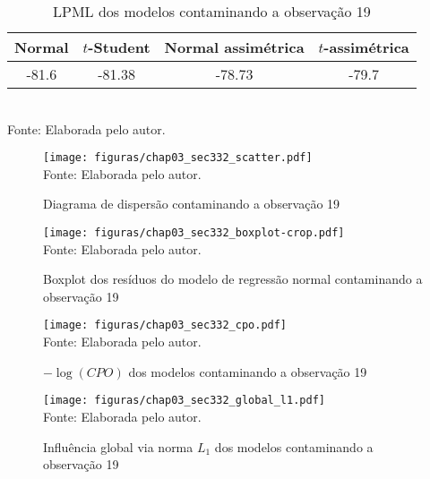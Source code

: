 \begin{table}[H]
\begin{center}
\caption{LPML dos modelos contaminando a observação 19}
\label{tab:chap03_sec332_lpml}
\begin{tabular}{cccc}
 Normal & $t$-Student & Normal assimétrica  & $t$-assimétrica \\ \hline
-81.6 & -81.38 & -78.73 & -79.7 \\ \hline
\end{tabular}
\\ Fonte: Elaborada pelo autor.
\end{center}
\end{table}

\begin{figure}[H]
\begin{center}
\caption{Diagrama de dispersão contaminando a observação 19}
\label{fig:chap03_sec332_scatter}
\texttt{[image: figuras/chap03\_sec332\_scatter.pdf]}
\\ Fonte: Elaborada pelo autor.
\end{center}
\end{figure}

\begin{figure}[H]
\begin{center}
\caption{Boxplot dos resíduos do modelo de regressão normal contaminando a observação 19}
\label{fig:chap03_sec332_boxplot}
\texttt{[image: figuras/chap03\_sec332\_boxplot-crop.pdf]}
\\ Fonte: Elaborada pelo autor.
\end{center}
\end{figure}

\begin{figure}[H]
\begin{center}
\caption{$-\log(CPO)$ dos modelos contaminando a observação 19}
\label{fig:chap03_sec332_cpo}
\texttt{[image: figuras/chap03\_sec332\_cpo.pdf]}
\\ Fonte: Elaborada pelo autor.
\end{center}
\end{figure}

\begin{figure}[H]
\begin{center}
\caption{Influência global via norma $L_1$ dos modelos contaminando a observação 19}
\label{fig:chap03_sec332_global_l1}
\texttt{[image: figuras/chap03\_sec332\_global\_l1.pdf]}
\\ Fonte: Elaborada pelo autor.
\end{center}
\end{figure}

